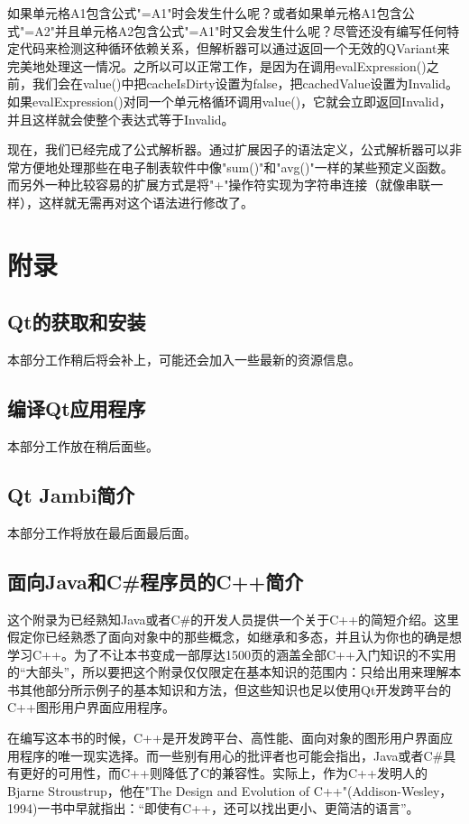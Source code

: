 \documentclass[11pt,oneside]{book}
\begin{document}
\begin{common-format}
如果单元格A1包含公式"=A1"时会发生什么呢？或者如果单元格A1包含公式"=A2"并且单元格A2包含公式"=A1"时又会发生什么呢？尽管还没有编写任何特定代码来检测这种循环依赖关系，但解析器可以通过返回一个无效的QVariant来完美地处理这一情况。之所以可以正常工作，是因为在调用evalExpression()之前，我们会在value()中把cacheIsDirty设置为false，把cachedValue设置为Invalid。如果evalExpression()对同一个单元格循环调用value()，它就会立即返回Invalid，并且这样就会使整个表达式等于Invalid。

现在，我们已经完成了公式解析器。通过扩展因子的语法定义，公式解析器可以非常方便地处理那些在电子制表软件中像"sum()"和"avg()"一样的某些预定义函数。而另外一种比较容易的扩展方式是将"+"操作符实现为字符串连接（就像串联一样），这样就无需再对这个语法进行修改了。


\appendix

\part{附录}
\chapter{Qt的获取和安装}
本部分工作稍后将会补上，可能还会加入一些最新的资源信息。


\chapter{编译Qt应用程序}
本部分工作放在稍后面些。

\chapter{Qt Jambi简介}
本部分工作将放在最后面最后面。

\chapter{面向Java和C\#{}程序员的C++简介}
这个附录为已经熟知Java或者C\#{}的开发人员提供一个关于C++的简短介绍。这里假定你已经熟悉了面向对象中的那些概念，如继承和多态，并且认为你也的确是想学习C++。为了不让本书变成一部厚达1500页的涵盖全部C++入门知识的不实用的“大部头”，所以要把这个附录仅仅限定在基本知识的范围内：只给出用来理解本书其他部分所示例子的基本知识和方法，但这些知识也足以使用Qt开发跨平台的C++图形用户界面应用程序。

在编写这本书的时候，C++是开发跨平台、高性能、面向对象的图形用户界面应用程序的唯一现实选择。而一些别有用心的批评者也可能会指出，Java或者C\#{}具有更好的可用性，而C++则降低了C的兼容性。实际上，作为C++发明人的Bjarne Stroustrup，他在"The Design and Evolution of C++"(Addison-Wesley，1994)一书中早就指出：“即使有C++，还可以找出更小、更简洁的语言”。


\end{common-format}
\end{document}
